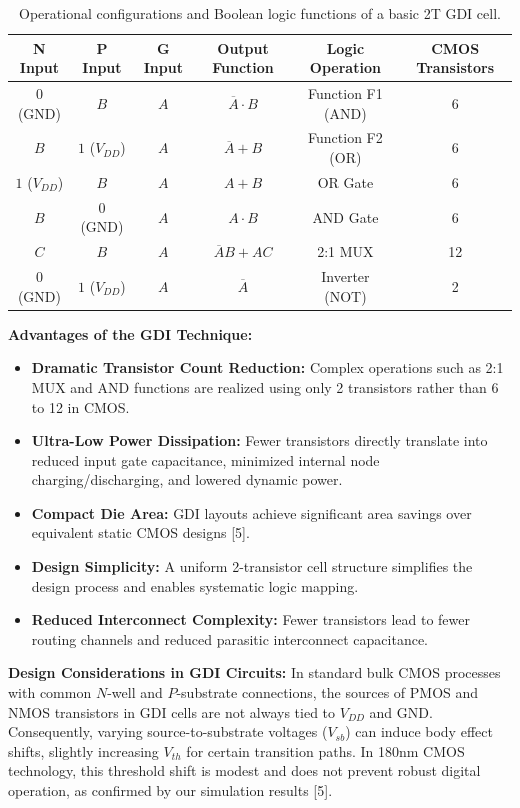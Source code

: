 \documentclass[12pt,a4paper,oneside]{report}
\begin{document}
\begin{table}[H]
\centering
\caption{Operational configurations and Boolean logic functions of a basic 2T GDI cell.}
\label{tab:lit_gdifunc}
\vspace{0.2cm}
\begin{tabular}{|c|c|c|c|c|c|}
\hline
\textbf{N Input} & \textbf{P Input} & \textbf{G Input} & \textbf{Output Function} & \textbf{Logic Operation} & \textbf{CMOS Transistors} \\
\hline
$0$ (GND) & $B$ & $A$ & $\overline{A} \cdot B$ & Function F1 (AND) & 6 \\
\hline
$B$ & $1$ ($V_{DD}$) & $A$ & $\overline{A} + B$ & Function F2 (OR) & 6 \\
\hline
$1$ ($V_{DD}$) & $B$ & $A$ & $A + B$ & OR Gate & 6 \\
\hline
$B$ & $0$ (GND) & $A$ & $A \cdot B$ & AND Gate & 6 \\
\hline
$C$ & $B$ & $A$ & $\overline{A} B + A C$ & 2:1 MUX & 12 \\
\hline
$0$ (GND) & $1$ ($V_{DD}$) & $A$ & $\overline{A}$ & Inverter (NOT) & 2 \\
\hline
\end{tabular}
\end{table}

\noindent\textbf{Advantages of the GDI Technique:}
\begin{itemize}
\item \textbf{Dramatic Transistor Count Reduction:} Complex operations such as 2:1 MUX and AND functions are realized using only 2 transistors rather than 6 to 12 in CMOS.
\item \textbf{Ultra-Low Power Dissipation:} Fewer transistors directly translate into reduced input gate capacitance, minimized internal node charging/discharging, and lowered dynamic power.
\item \textbf{Compact Die Area:} GDI layouts achieve significant area savings over equivalent static CMOS designs [5].
\item \textbf{Design Simplicity:} A uniform 2-transistor cell structure simplifies the design process and enables systematic logic mapping.
\item \textbf{Reduced Interconnect Complexity:} Fewer transistors lead to fewer routing channels and reduced parasitic interconnect capacitance.
\end{itemize}

\noindent\textbf{Design Considerations in GDI Circuits:}
In standard bulk CMOS processes with common $N$-well and $P$-substrate connections, the sources of PMOS and NMOS transistors in GDI cells are not always tied to $V_{DD}$ and GND. Consequently, varying source-to-substrate voltages ($V_{sb}$) can induce body effect shifts, slightly increasing $V_{th}$ for certain transition paths. In 180nm CMOS technology, this threshold shift is modest and does not prevent robust digital operation, as confirmed by our simulation results [5].
\end{document}
